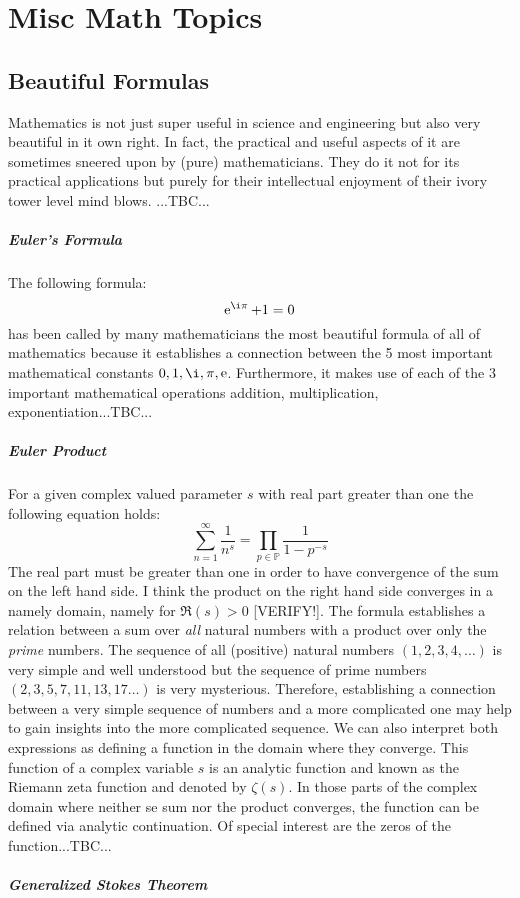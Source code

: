 \chapter{Misc Math Topics}

\section{Beautiful Formulas}
Mathematics is not just super useful in science and engineering but also very beautiful in it own right. In fact, the practical and useful aspects of it are sometimes sneered upon by (pure) mathematicians. They do it not for its practical applications but purely for their intellectual enjoyment of their ivory tower level mind blows. ...TBC...


\paragraph{Euler's Formula}
The following formula:
\begin{equation}
\e^{\i \pi} + 1 = 0
\end{equation}
has been called by many mathematicians the most beautiful formula of all of mathematics because it establishes a connection between the 5 most important mathematical constants $0,1,\i,\pi,\e$. Furthermore, it makes use of each of the 3 important mathematical operations addition, multiplication, exponentiation...TBC...


\paragraph{Euler Product}
For a given complex valued parameter $s$ with real part greater than one the following equation holds:
\begin{equation}
\sum_{n=1}^{\infty} \frac{1}{n^s} = 
\prod_{p \in \mathbb{P}} \frac{1}{1 - p^{-s}}
\end{equation}
The real part must be greater than one in order to have convergence of the sum on the left hand side. I think the product on the right hand side converges in a namely domain, namely for $\Re(s) > 0$ [VERIFY!]. The formula establishes a relation between a sum over \emph{all} natural numbers with a product over only the \emph{prime} numbers. The sequence of all (positive) natural numbers $(1,2,3,4,\ldots)$ is very simple and well understood but the sequence of prime numbers $(2,3,5,7,11,13,17\ldots)$ is very mysterious. Therefore, establishing a connection between a very simple sequence of numbers and a more complicated one may help to gain insights into the more complicated sequence. We can also interpret both expressions as defining a function in the domain where they converge. This function of a complex variable $s$ is an analytic function and known as the Riemann zeta function and denoted by $\zeta(s)$. In those parts of the complex domain where neither se sum nor the product converges, the function can be defined via analytic continuation. Of special interest are the zeros of the function...TBC...

\paragraph{Generalized Stokes Theorem}

